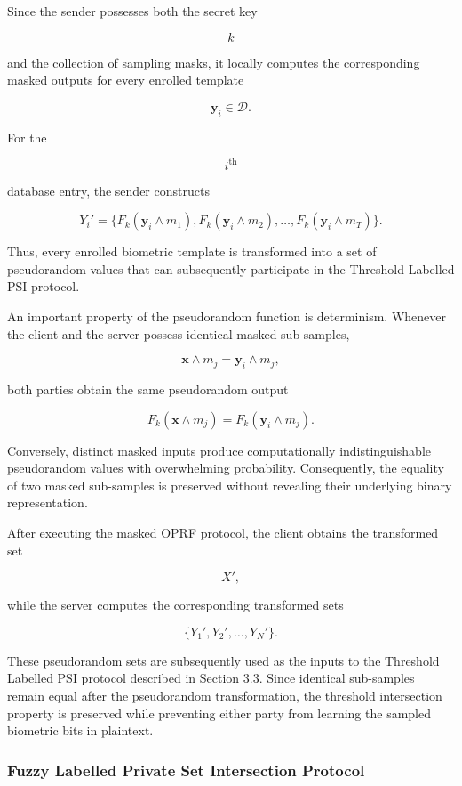 \documentclass[11pt,a4paper]{article}
\begin{document}
Since the sender possesses both the secret key

\[
k
\]

and the collection of sampling masks, it locally computes the corresponding masked outputs for every enrolled template

\[
\mathbf{y}_i
\in
\mathcal{D}.
\]

For the

\[
i^{\text{th}}
\]

database entry, the sender constructs

\[
Y_i'
=
\{
F_k(\mathbf{y}_i\wedge m_1),
F_k(\mathbf{y}_i\wedge m_2),
\ldots,
F_k(\mathbf{y}_i\wedge m_T)
\}.
\]

Thus, every enrolled biometric template is transformed into a set of pseudorandom values that can subsequently participate in the Threshold Labelled PSI protocol.

An important property of the pseudorandom function is determinism. Whenever the client and the server possess identical masked sub-samples,

\[
\mathbf{x}\wedge m_j
=
\mathbf{y}_i\wedge m_j,
\]

both parties obtain the same pseudorandom output

\[
F_k(\mathbf{x}\wedge m_j)
=
F_k(\mathbf{y}_i\wedge m_j).
\]

Conversely, distinct masked inputs produce computationally indistinguishable pseudorandom values with overwhelming probability. Consequently, the equality of two masked sub-samples is preserved without revealing their underlying binary representation.

After executing the masked OPRF protocol, the client obtains the transformed set

\[
X',
\]

while the server computes the corresponding transformed sets

\[
\{
Y_1',
Y_2',
\ldots,
Y_N'
\}.
\]

These pseudorandom sets are subsequently used as the inputs to the Threshold Labelled PSI protocol described in Section 3.3. Since identical sub-samples remain equal after the pseudorandom transformation, the threshold intersection property is preserved while preventing either party from learning the sampled biometric bits in plaintext.

\subsubsection{Fuzzy Labelled Private Set Intersection Protocol}
\end{document}

